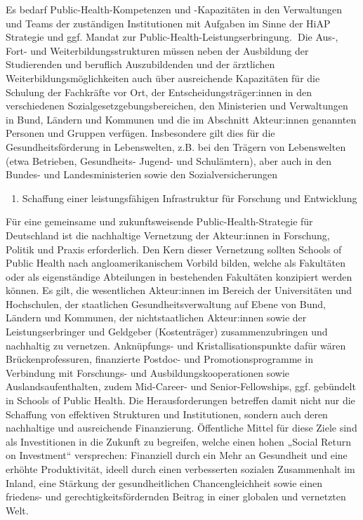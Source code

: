 \documentclass{article}
\begin{document}
Es bedarf Public-Health-Kompetenzen und -Kapazitäten in den Verwaltungen und Teams der zuständigen Institutionen mit Aufgaben im Sinne der HiAP Strategie und ggf. Mandat zur Public-Health-Leistungserbringung.\textbf{ }Die Aus-, Fort- und Weiterbildungsstrukturen müssen neben der Ausbildung der Studierenden und beruflich Auszubildenden und der ärztlichen Weiterbildungsmöglichkeiten auch über ausreichende Kapazitäten für die Schulung der Fachkräfte vor Ort, der Entscheidungsträger:innen in den verschiedenen Sozialgesetzgebungsbereichen, den Ministerien und Verwaltungen in Bund, Ländern und Kommunen und die im Abschnitt Akteur:innen genannten Personen und Gruppen verfügen. Insbesondere gilt dies für die Gesundheitsförderung in Lebenswelten, z.B. bei den Trägern von Lebenswelten (etwa Betrieben, Gesundheits- Jugend- und Schulämtern), aber auch in den Bundes- und Landesministerien sowie den Sozialversicherungen

\begin{enumerate}[start=3]
\item Schaffung einer leistungsfähigen Infrastruktur für Forschung und Entwicklung


\end{enumerate}

Für eine gemeinsame und zukunftsweisende Public-Health-Strategie für Deutschland ist die nachhaltige Vernetzung der Akteur:innen in Forschung, Politik und Praxis erforderlich. Den Kern dieser Vernetzung sollten Schools of Public Health nach angloamerikanischem Vorbild bilden, welche als Fakultäten oder als eigenständige Abteilungen in bestehenden Fakultäten konzipiert werden können. Es gilt, die wesentlichen Akteur:innen im Bereich der Universitäten und Hochschulen, der staatlichen Gesundheitsverwaltung auf Ebene von Bund, Ländern und Kommunen, der nichtstaatlichen Akteur:innen sowie der Leistungserbringer und Geldgeber (Kostenträger) zusammenzubringen und nachhaltig zu vernetzen. Anknüpfungs- und Kristallisationspunkte dafür wären Brückenprofessuren, finanzierte Postdoc- und Promotionsprogramme in Verbindung mit Forschungs- und Ausbildungskooperationen sowie Auslandsaufenthalten, zudem Mid-Career- und Senior-Fellowships, ggf. gebündelt in Schools of Public Health. Die Herausforderungen betreffen damit nicht nur die Schaffung von effektiven Strukturen und Institutionen, sondern auch deren nachhaltige und ausreichende Finanzierung. Öffentliche Mittel für diese Ziele sind als Investitionen in die Zukunft zu begreifen, welche einen hohen „Social Return on Investment“ versprechen: Finanziell durch ein Mehr an Gesundheit und eine erhöhte Produktivität, ideell durch einen verbesserten sozialen Zusammenhalt im Inland, eine Stärkung der gesundheitlichen Chancengleichheit sowie einen friedens- und gerechtigkeitsfördernden Beitrag in einer globalen und vernetzten Welt.
\end{document}
